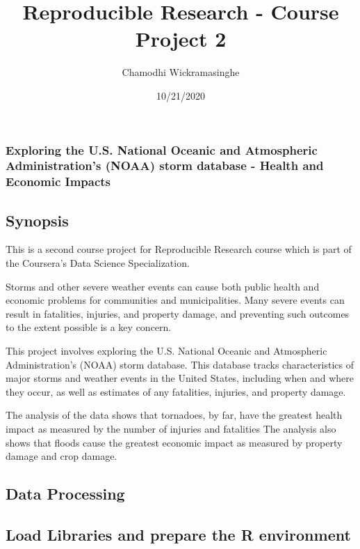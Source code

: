\documentclass[
]{article}
\title{Reproducible Research - Course Project 2}
\author{Chamodhi Wickramasinghe}
\date{10/21/2020}
\begin{document}
\maketitle

\hypertarget{exploring-the-u.s.-national-oceanic-and-atmospheric-administrations-noaa-storm-database---health-and-economic-impacts}{%
\subsubsection{Exploring the U.S. National Oceanic and Atmospheric
Administration's (NOAA) storm database - Health and Economic
Impacts}\label{exploring-the-u.s.-national-oceanic-and-atmospheric-administrations-noaa-storm-database---health-and-economic-impacts}}

\hypertarget{synopsis}{%
\subsection{Synopsis}\label{synopsis}}

This is a second course project for Reproducible Research course which
is part of the Coursera's Data Science Specialization.

Storms and other severe weather events can cause both public health and
economic problems for communities and municipalities. Many severe events
can result in fatalities, injuries, and property damage, and preventing
such outcomes to the extent possible is a key concern.

This project involves exploring the U.S. National Oceanic and
Atmospheric Administration's (NOAA) storm database. This database tracks
characteristics of major storms and weather events in the United States,
including when and where they occur, as well as estimates of any
fatalities, injuries, and property damage.

The analysis of the data shows that tornadoes, by far, have the greatest
health impact as measured by the number of injuries and fatalities The
analysis also shows that floods cause the greatest economic impact as
measured by property damage and crop damage.

\hypertarget{data-processing}{%
\subsection{Data Processing}\label{data-processing}}

\hypertarget{load-libraries-and-prepare-the-r-environment}{%
\subsection{Load Libraries and prepare the R
environment}\label{load-libraries-and-prepare-the-r-environment}}
\end{document}
